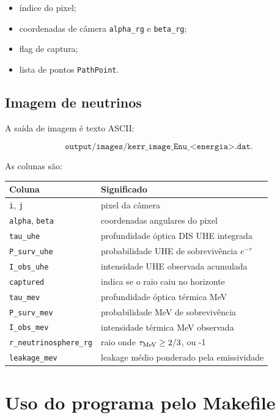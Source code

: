 \documentclass[11pt,a4paper]{article}
\begin{document}
\begin{itemize}
  \item índice do pixel;
  \item coordenadas de câmera \texttt{alpha\_rg} e \texttt{beta\_rg};
  \item flag de captura;
  \item lista de pontos \texttt{PathPoint}.
\end{itemize}

\subsection{Imagem de neutrinos}

A saída de imagem é texto ASCII:

\begin{equation}
  \texttt{output/images/kerr\_image\_Enu\_<energia>.dat}.
\end{equation}

As colunas são:

\begin{center}
\begin{tabular}{ll}
\toprule
Coluna & Significado\\
\midrule
\texttt{i}, \texttt{j} & pixel da câmera\\
\texttt{alpha}, \texttt{beta} & coordenadas angulares do pixel\\
\texttt{tau\_uhe} & profundidade óptica DIS UHE integrada\\
\texttt{P\_surv\_uhe} & probabilidade UHE de sobrevivência $e^{-\tau}$\\
\texttt{I\_obs\_uhe} & intensidade UHE observada acumulada\\
\texttt{captured} & indica se o raio caiu no horizonte\\
\texttt{tau\_mev} & profundidade óptica térmica MeV\\
\texttt{P\_surv\_mev} & probabilidade MeV de sobrevivência\\
\texttt{I\_obs\_mev} & intensidade térmica MeV observada\\
\texttt{r\_neutrinosphere\_rg} & raio onde $\tau_{\rm MeV}\geq2/3$, ou -1\\
\texttt{leakage\_mev} & leakage médio ponderado pela emissividade\\
\bottomrule
\end{tabular}
\end{center}

\section{Uso do programa pelo Makefile}
\end{document}
